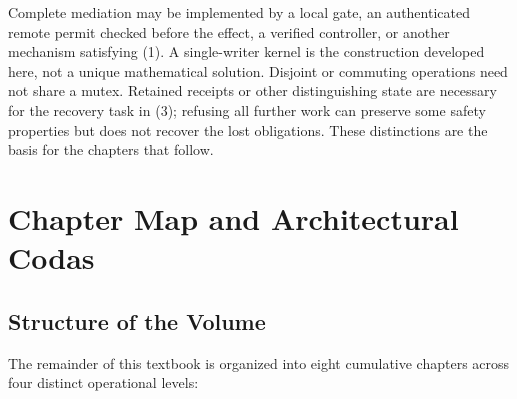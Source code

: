 Complete mediation may be implemented by a local gate, an authenticated remote permit checked before the effect, a verified controller, or another mechanism satisfying (1). A single-writer kernel is the construction developed here, not a unique mathematical solution. Disjoint or commuting operations need not share a mutex. Retained receipts or other distinguishing state are necessary for the recovery task in (3); refusing all further work can preserve some safety properties but does not recover the lost obligations. These distinctions are the basis for the chapters that follow.

\section{Chapter Map and Architectural Codas}\label{sec:prereq-map}

\subsection{Structure of the Volume}

The remainder of this textbook is organized into eight cumulative chapters across four distinct operational levels:

